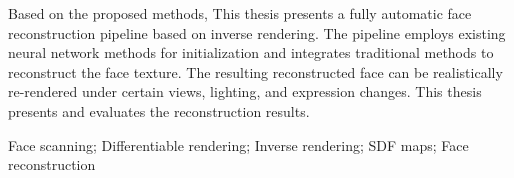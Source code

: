 \documentclass{scutmaster}
\begin{document}
Based on the proposed methods, This thesis presents a fully automatic face reconstruction pipeline based on inverse rendering.
The pipeline employs existing neural network methods for initialization and integrates traditional methods to reconstruct the face texture.
The resulting reconstructed face can be realistically re-rendered under certain views, lighting, and expression changes.
This thesis presents and evaluates the reconstruction results.

 Face scanning; Differentiable rendering; Inverse rendering; SDF maps; Face reconstruction

\tableofcontents

\listoffigures

\listoftables

\mainmatter









\end{document}
